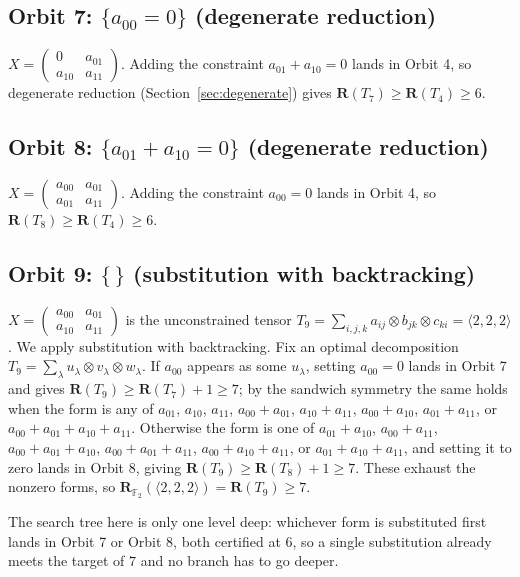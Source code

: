 \documentclass[11pt]{article}
\theoremstyle{definition}
\newcommand{\F}{\mathbb{F}}
\newcommand{\R}{\mathbf{R}}
\newcommand{\Rk}[2]{\mathbf{R}_{#1}(#2)}
\newcommand{\mmt}[3]{\langle #1,#2,#3\rangle}
\begin{document}
\subsection*{Orbit 7: $\{a_{00}=0\}$ (degenerate reduction)}
$X=
\begin{pmatrix}0 & a_{01} \\a_{10}&a_{11}
\end{pmatrix}$. Adding the constraint
$a_{01}+a_{10}=0$ lands in Orbit 4, so degenerate reduction
(Section~\ref{sec:degenerate}) gives $\R(T_7)\ge\R(T_4)\ge 6$.

\subsection*{Orbit 8: $\{a_{01}+a_{10}=0\}$ (degenerate reduction)}
$X=
\begin{pmatrix}a_{00} & a_{01} \\a_{01}&a_{11}
\end{pmatrix}$. Adding the constraint
$a_{00}=0$ lands in Orbit 4, so $\R(T_8)\ge\R(T_4)\ge 6$.

\subsection*{Orbit 9: $\{\,\}$ (substitution with backtracking)}
$X=
\begin{pmatrix}a_{00} & a_{01} \\a_{10}&a_{11}
\end{pmatrix}$ is the unconstrained
tensor $T_9=\sum_{i,j,k}a_{ij}\otimes b_{jk}\otimes c_{ki}=\mmt{2}{2}{2}$. We apply
substitution with backtracking. Fix an optimal decomposition
$T_9=\sum_\lambda u_\lambda\otimes v_\lambda\otimes w_\lambda$. If $a_{00}$ appears
as some $u_\lambda$, setting $a_{00}=0$ lands in Orbit 7 and gives
$\R(T_9)\ge\R(T_7)+1\ge 7$; by the sandwich symmetry the same holds when the form
is any of $a_{01}$, $a_{10}$, $a_{11}$, $a_{00}+a_{01}$, $a_{10}+a_{11}$,
$a_{00}+a_{10}$, $a_{01}+a_{11}$, or $a_{00}+a_{01}+a_{10}+a_{11}$. Otherwise the
form is one of $a_{01}+a_{10}$, $a_{00}+a_{11}$, $a_{00}+a_{01}+a_{10}$,
$a_{00}+a_{01}+a_{11}$, $a_{00}+a_{10}+a_{11}$, or $a_{01}+a_{10}+a_{11}$, and
setting it to zero lands in Orbit 8, giving $\R(T_9)\ge\R(T_8)+1\ge 7$. These
exhaust the nonzero forms, so $\Rk{\F_2}{\mmt{2}{2}{2}}=\R(T_9)\ge 7$.

The search tree here is only one level deep: whichever form is substituted first
lands in Orbit 7 or Orbit 8, both certified at $6$, so a single substitution already
meets the target of $7$ and no branch has to go deeper.
\end{document}
